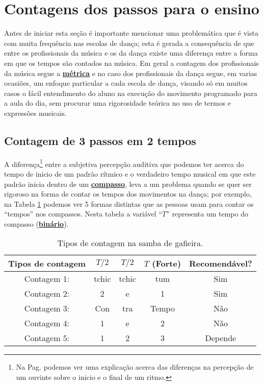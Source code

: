\section{Contagens dos passos para o ensino}
Antes de iniciar esta seção é importante mencionar uma
problemática que é vista com muita frequência nas escolas de dança; 
esta é gerada a consequência de que entre os profissionais da música e os da dança
existe uma diferença entre a forma em que os tempos são contados na música. 
Em geral a contagem dos profissionais da música segue a \hyperref[def:Metrica]{\textbf{métrica}}
e no caso dos profissionais da dança segue, em varias ocasiões, 
um enfoque particular a cada escola de dança, 
visando só em muitos casos 
o fácil entendimento do aluno na execução do movimento programado para a aula do dia, 
sem procurar uma rigorosidade teórica no uso de termos e expressões musicais.



\subsection{Contagem de 3 passos em 2 tempos}
\label{susec:3passos2tempos}
A diferença\footnote{Na Pag. \pageref{fig:RitmoVsFala} podemos ver uma explicação
acerca das diferenças na percepção de um ouvinte
sobre o inicio e o final de um ritmo.} 
entre
% 
a subjetiva percepção auditiva que podemos ter acerca do tempo de inicio de um padrão rítmico e 
o verdadeiro tempo musical em que este padrão inicia dentro  de um \hyperref[def:Compasso]{\textbf{compasso}}, 
%
leva a um problema quando se quer ser rigoroso na forma de contar os tempos dos movimentos na dança; 
por exemplo, na Tabela \ref{tab:ritmo1} podemos ver 5 formas distintas que as pessoas usam 
para contar os ``tempos'' nos compassos. 
Nesta tabela a variável ``$T$'' representa um tempo do compasso (\hyperref[subsec:compassobinario]{\textbf{binário}}).
\begin{table}[h]
  \centering
  \begin{tabular}    {c|ccc|c}
    \hline
    Tipos de contagem       & $T/2$ & $T/2$   & $T$ (Forte) & Recomendável?\\
    \hline
    Contagem 1: & tchic  & tchic  & tum   & Sim\\
    Contagem 2: & 2     & e     & 1     & Sim\\ \hline
    Contagem 3: & Con   & tra  & Tempo & Não\\
    Contagem 4: & 1     & e     & 2     & Não\\  \hline
    Contagem 5: & 1     & 2     & 3     & Depende\\ \hline
    \hline
  \end{tabular}
  \caption{Tipos de contagem na samba de gafieira.}
\label{tab:ritmo1}
\end{table}

